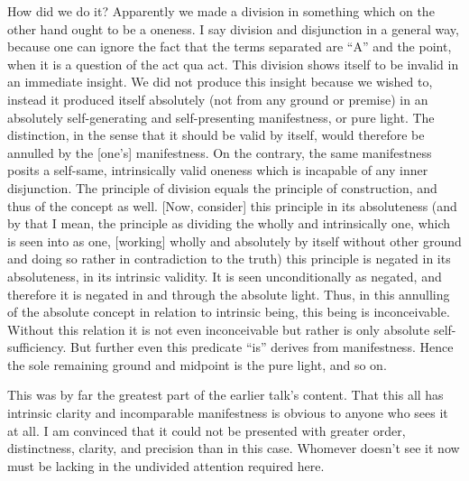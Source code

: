 How did we do it?
Apparently we made a division in something which
on the other hand ought to be a oneness.
I say division and disjunction in a general way,
because one can ignore the fact that the terms separated
are “A” and the point, when it is a question of the act qua act.
This division shows itself to be invalid in an immediate insight.
We did not produce this insight because we wished to,
instead it produced itself absolutely
(not from any ground or premise)
in an absolutely self-generating
and self-presenting manifestness,
or pure light.
The distinction, in the sense that it should be valid by itself,
would therefore be annulled by the [one's] manifestness.
On the contrary, the same manifestness posits
a self-same, intrinsically valid oneness
which is incapable of any inner disjunction.
The principle of division equals the principle of construction,
and thus of the concept as well.
[Now, consider] this principle in its absoluteness
(and by that I mean, the principle as dividing
the wholly and intrinsically one,
which is seen into as one,
[working] wholly and absolutely by itself
without other ground and doing so rather
in contradiction to the truth)
this principle is negated in its absoluteness,
in its intrinsic validity.
It is seen unconditionally as negated,
and therefore it is negated
in and through the absolute light.
Thus, in this annulling of the absolute concept
in relation to intrinsic being,
this being is inconceivable.
Without this relation it is not even inconceivable
but rather is only absolute self-sufficiency.
But further even this predicate “is”
derives from manifestness.
Hence the sole remaining ground and midpoint is
the pure light, and so on.

This was by far the greatest part
of the earlier talk's content.
That this all has intrinsic clarity
and incomparable manifestness is
obvious to anyone who sees it at all.
I am convinced that it could not be presented
with greater order, distinctness, clarity,
and precision than in this case.
Whomever doesn't see it now must be lacking
in the undivided attention required here.

